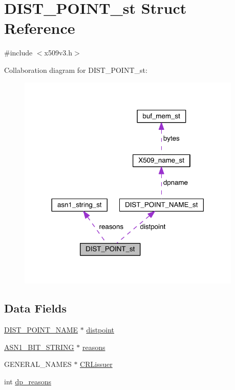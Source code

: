 \hypertarget{struct_d_i_s_t___p_o_i_n_t__st}{}\section{D\+I\+S\+T\+\_\+\+P\+O\+I\+N\+T\+\_\+st Struct Reference}
\label{struct_d_i_s_t___p_o_i_n_t__st}


{\ttfamily \#include $<$x509v3.\+h$>$}



Collaboration diagram for D\+I\+S\+T\+\_\+\+P\+O\+I\+N\+T\+\_\+st\+:\nopagebreak
\begin{figure}[H]
\begin{center}
\leavevmode
\includegraphics[width=302pt]{struct_d_i_s_t___p_o_i_n_t__st__coll__graph}
\end{center}
\end{figure}
\subsection*{Data Fields}
\begin{DoxyCompactItemize}
\item 
\hyperlink{crypto_2x509v3_2x509v3_8h_a1e98b413217a18a88255e02b31263c93}{D\+I\+S\+T\+\_\+\+P\+O\+I\+N\+T\+\_\+\+N\+A\+ME} $\ast$ \hyperlink{struct_d_i_s_t___p_o_i_n_t__st_a68c5a256dcc49ce4f3b635f9d06ae331}{distpoint}
\item 
\hyperlink{crypto_2ossl__typ_8h_af837aaa00e151b1e8773aea5a8fe1cc4}{A\+S\+N1\+\_\+\+B\+I\+T\+\_\+\+S\+T\+R\+I\+NG} $\ast$ \hyperlink{struct_d_i_s_t___p_o_i_n_t__st_a858bec48e17bb85ac7e4115a5a5a34e1}{reasons}
\item 
G\+E\+N\+E\+R\+A\+L\+\_\+\+N\+A\+M\+ES $\ast$ \hyperlink{struct_d_i_s_t___p_o_i_n_t__st_a93694b9256dc1554100680af38a03b8f}{C\+R\+Lissuer}
\item 
int \hyperlink{struct_d_i_s_t___p_o_i_n_t__st_ae8fb53d1aff408520802c24fdfaccc30}{dp\+\_\+reasons}
\end{DoxyCompactItemize}


